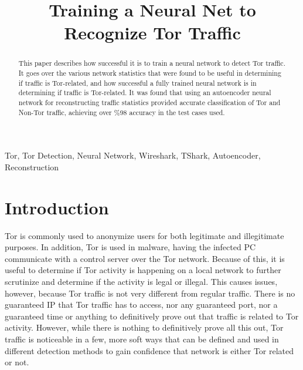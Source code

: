 \documentclass[conference,12pt]{IEEEtran}
\begin{document}
\title{Training a Neural Net to Recognize Tor Traffic}

\author{
\and
{}
}

\maketitle

\begin{abstract}
This paper describes how successful it is to train a neural network to detect Tor traffic. It goes over the various network statistics that were found to be useful in determining if traffic is Tor-related, and how successful a fully trained neural network is in determining if traffic is Tor-related. It was found that using an autoencoder neural network for reconstructing traffic statistics provided accurate classification of Tor and Non-Tor traffic, achieving over $\%98$ accuracy in the test cases used. 
\end{abstract}

\begin{IEEEkeywords}
Tor, Tor Detection, Neural Network, Wireshark, TShark, Autoencoder, Reconstruction
\end{IEEEkeywords}

\section{Introduction}
Tor is commonly used to anonymize users for both legitimate and illegitimate purposes. In addition, Tor is used in malware, having the infected PC communicate with a control server over the Tor network. Because of this, it is useful to determine if Tor activity is happening on a local network to further scrutinize and determine if the activity is legal or illegal. This causes issues, however, because Tor traffic is not very different from regular traffic. There is no guaranteed IP that Tor traffic has to access, nor any guaranteed port, nor a guaranteed time or anything to definitively prove out that traffic is related to Tor activity. However, while there is nothing to definitively prove all this out, Tor traffic is noticeable in a few, more soft ways that can be defined and used in different detection methods to gain confidence that network is either Tor related or not.
\end{document}
